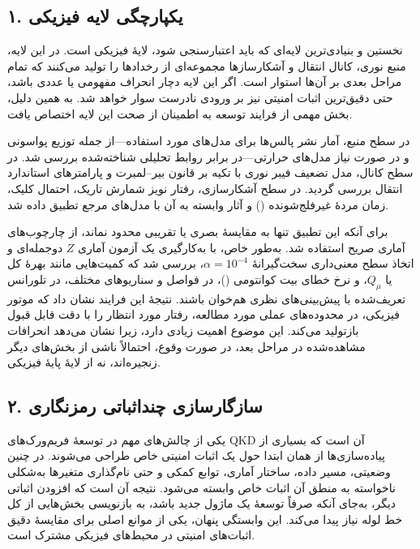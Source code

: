 \begin{sloppypar}
\subsection*{۱. یکپارچگی لایه فیزیکی}

نخستین و بنیادی‌ترین لایه‌ای که باید اعتبارسنجی شود، لایهٔ فیزیکی است. در این لایه، منبع نوری، کانال انتقال و آشکارسازها مجموعه‌ای از رخدادها را تولید می‌کنند که تمام مراحل بعدی بر آن‌ها استوار است. اگر این لایه دچار انحراف مفهومی یا عددی باشد، حتی دقیق‌ترین اثبات امنیتی نیز بر ورودی نادرست سوار خواهد شد. به همین دلیل، بخش مهمی از فرایند توسعه به اطمینان از صحت این لایه اختصاص یافت.

در سطح منبع، آمار نشر پالس‌ها برای مدل‌های مورد استفاده—از جمله توزیع پواسونی و در صورت نیاز مدل‌های حرارتی—در برابر روابط تحلیلی شناخته‌شده بررسی شد. در سطح کانال، مدل تضعیف فیبر نوری با تکیه بر قانون بیر–لمبرت و پارامترهای استاندارد انتقال بررسی گردید. در سطح آشکارسازی، رفتار نویز شمارش تاریک، احتمال کلیک، زمان مردهٔ غیرفلج‌شونده () و آثار وابسته به آن با مدل‌های مرجع تطبیق داده شد.

برای آنکه این تطبیق تنها به مقایسهٔ بصری یا تقریبی محدود نماند، از چارچوب‌های آماری صریح استفاده شد. به‌طور خاص، با به‌کارگیری یک آزمون آماری \(Z\) دوجمله‌ای و اتخاذ سطح معنی‌داری سخت‌گیرانهٔ \(\alpha = 10^{-4}\)، بررسی شد که کمیت‌هایی مانند بهرهٔ کل یا \(Q_\mu\)، و نرخ خطای بیت کوانتومی ()، در فواصل و سناریوهای مختلف، در تلورانس تعریف‌شده با پیش‌بینی‌های نظری هم‌خوان باشند. نتیجهٔ این فرایند نشان داد که موتور فیزیکی، در محدوده‌های عملی مورد مطالعه، رفتار مورد انتظار را با دقت قابل قبول بازتولید می‌کند. این موضوع اهمیت زیادی دارد، زیرا نشان می‌دهد انحرافات مشاهده‌شده در مراحل بعد، در صورت وقوع، احتمالاً ناشی از بخش‌های دیگر زنجیره‌اند، نه از لایهٔ پایهٔ فیزیکی.

\subsection*{۲. سازگارسازی چند‌اثباتی رمزنگاری}

یکی از چالش‌های مهم در توسعهٔ فریم‌ورک‌های QKD آن است که بسیاری از پیاده‌سازی‌ها از همان ابتدا حول یک اثبات امنیتی خاص طراحی می‌شوند. در چنین وضعیتی، مسیر داده، ساختار آماری، توابع کمکی و حتی نام‌گذاری متغیرها به‌شکلی ناخواسته به منطق آن اثبات خاص وابسته می‌شود. نتیجه آن است که افزودن اثباتی دیگر، به‌جای آنکه صرفاً توسعهٔ یک ماژول جدید باشد، به بازنویسی بخش‌هایی از کل خط لوله نیاز پیدا می‌کند. این وابستگی پنهان، یکی از موانع اصلی برای مقایسهٔ دقیق اثبات‌های امنیتی در محیط‌های فیزیکی مشترک است.


\end{sloppypar}

